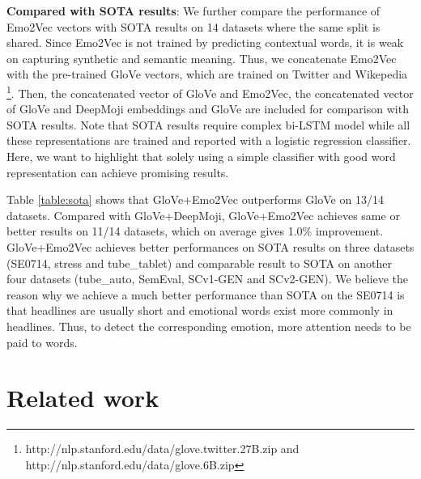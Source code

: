 \documentclass[11pt,a4paper]{article}
\begin{document}
\noindent\textbf{Compared with SOTA results}: We further compare the performance of Emo2Vec vectors with SOTA results on 14 datasets where the same split is shared. Since Emo2Vec is not trained by predicting contextual words, it is weak on capturing synthetic and semantic meaning. Thus, we concatenate Emo2Vec with the pre-trained GloVe vectors, which are trained on Twitter and Wikepedia \footnote{http://nlp.stanford.edu/data/glove.twitter.27B.zip and http://nlp.stanford.edu/data/glove.6B.zip}. Then, the concatenated vector of GloVe and Emo2Vec, the concatenated vector of GloVe and DeepMoji embeddings and GloVe  are included for comparison with SOTA results. Note that SOTA results require complex bi-LSTM model while all these representations are trained and reported with a logistic regression classifier. Here, we want to highlight that solely using a simple classifier with good word representation can achieve promising results. 
 

Table \ref{table:sota} shows that GloVe+Emo2Vec outperforms GloVe on 13/14 datasets. Compared with GloVe+DeepMoji, GloVe+Emo2Vec achieves same or better results on 11/14 datasets, which on average gives 1.0\% improvement.  GloVe+Emo2Vec achieves better performances on SOTA results on three datasets (SE0714, stress and tube\_tablet) and comparable result to SOTA on another four datasets (tube\_auto, SemEval, SCv1-GEN and SCv2-GEN). We believe the reason why we achieve a much better performance than SOTA  on the SE0714 is that headlines are usually short and emotional words exist more commonly in headlines. Thus, to detect the corresponding emotion, more attention needs to be paid to words. 

















\section{Related work}
\end{document}
